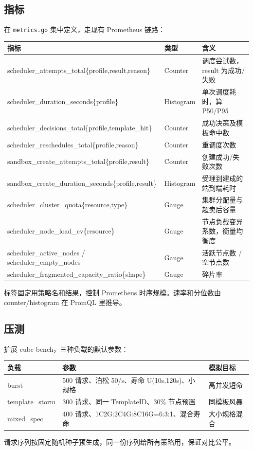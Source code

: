 \documentclass[UTF8,fontset=none,zihao=-4]{ctexart}
\newcommand{\code}[1]{\colorbox{gray!12}{\texttt{#1}}}
\begin{document}
\subsection*{指标}

在 \code{metrics.go} 集中定义，走现有 Prometheus 链路：

\begin{table}[H]
\centering\small
\begin{tabularx}{\textwidth}{L{0.46\textwidth}L{0.18\textwidth}L{0.36\textwidth}}
\toprule
\textbf{指标} & \textbf{类型} & \textbf{含义} \\
\midrule
scheduler\_attempts\_total\{profile,result,reason\} & Counter & 调度尝试数，result 为成功/失败 \\
scheduler\_duration\_seconds\{profile\} & Histogram & 单次调度耗时，算 P50/P95 \\
scheduler\_decisions\_total\{profile,template\_hit\} & Counter & 成功决策及模板命中数 \\
scheduler\_reschedules\_total\{profile,reason\} & Counter & 重调度次数 \\
sandbox\_create\_attempts\_total\{profile,result\} & Counter & 创建成功/失败次数 \\
sandbox\_create\_duration\_seconds\{profile,result\} & Histogram & 受理到建成的端到端耗时 \\
scheduler\_cluster\_quota\{resource,type\} & Gauge & 集群分配量与超卖后容量 \\
scheduler\_node\_load\_cv\{resource\} & Gauge & 节点负载变异系数，衡量均衡度 \\
scheduler\_active\_nodes / scheduler\_empty\_nodes & Gauge & 活跃节点数 / 空节点数 \\
scheduler\_fragmented\_capacity\_ratio\{shape\} & Gauge & 碎片率 \\
\bottomrule
\end{tabularx}
\end{table}

标签固定用策略名和结果，控制 Prometheus 时序规模。速率和分位数由 counter/histogram 在 PromQL 里推导。

\subsection*{压测}

扩展 cube-bench，三种负载的默认参数：

\begin{table}[H]
\centering\small
\begin{tabularx}{\textwidth}{L{0.24\textwidth}L{0.46\textwidth}L{0.30\textwidth}}
\toprule
\textbf{负载} & \textbf{参数} & \textbf{模拟目标} \\
\midrule
burst & 500 请求、泊松 50/s、寿命 U(10s,120s)、小规格 & 高并发短命 \\
template\_storm & 300 请求、同一 TemplateID、30\% 节点预置 & 同模板风暴 \\
mixed\_spec & 400 请求、1C2G:2C4G:8C16G=6:3:1、混合寿命 & 大小规格混合 \\
\bottomrule
\end{tabularx}
\end{table}

请求序列按固定随机种子预生成，同一份序列给所有策略用，保证对比公平。
\end{document}
